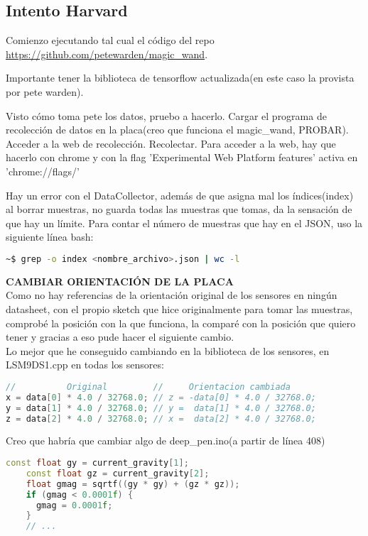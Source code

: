 \begin{mimargen}{-1cm}{-1cm}

\chapter{Intento Harvard}

Comienzo ejecutando tal cual el código del repo
\url{https://github.com/petewarden/magic_wand}.

Importante tener la biblioteca de tensorflow actualizada(en este
caso la provista por pete warden).

Visto cómo toma pete los datos, pruebo a hacerlo.
Cargar el programa de recolección de datos en la placa(creo que funciona el magic\_wand,
PROBAR).
Acceder a la web de recolección. Recolectar.
Para acceder a la web, hay que hacerlo con chrome y con la flag
'Experimental Web Platform features' activa en 'chrome://flags/'


Hay un error con el DataCollector, además de que asigna mal los índices(index)
al borrar muestras, no guarda todas las muestras que tomas, da la sensación de que
hay un límite.
Para contar el número de muestras que hay en el JSON, uso la siguiente línea bash:
\begin{lstlisting}[language=bash]
~$ grep -o index <nombre_archivo>.json | wc -l
\end{lstlisting}



\textbf{CAMBIAR ORIENTACIÓN DE LA PLACA} \\
Como no hay referencias de la orientación original de los sensores en ningún
datasheet, con el propio sketch que hice originalmente para tomar las muestras,
comprobé la posición con la que funciona, la comparé con la posición que quiero
tener y gracias a eso pude hacer el siguiente cambio.\\
Lo mejor que he conseguido cambiando en la biblioteca de los sensores,
en LSM9DS1.cpp en todas los sensores:
\begin{lstlisting}[language=c++]
//          Original         //     Orientacion cambiada
x = data[0] * 4.0 / 32768.0; // z = -data[0] * 4.0 / 32768.0;
y = data[1] * 4.0 / 32768.0; // y =  data[1] * 4.0 / 32768.0;
z = data[2] * 4.0 / 32768.0; // x =  data[2] * 4.0 / 32768.0;
\end{lstlisting}

\newpage
Creo que habría que cambiar algo de deep\_pen.ino(a partir de línea 408)
\begin{lstlisting}[language=c++]
    const float gy = current_gravity[1];
    const float gz = current_gravity[2];
    float gmag = sqrtf((gy * gy) + (gz * gz));
    if (gmag < 0.0001f) {
      gmag = 0.0001f;
    }
    // ...
\end{lstlisting}



\end{mimargen}
